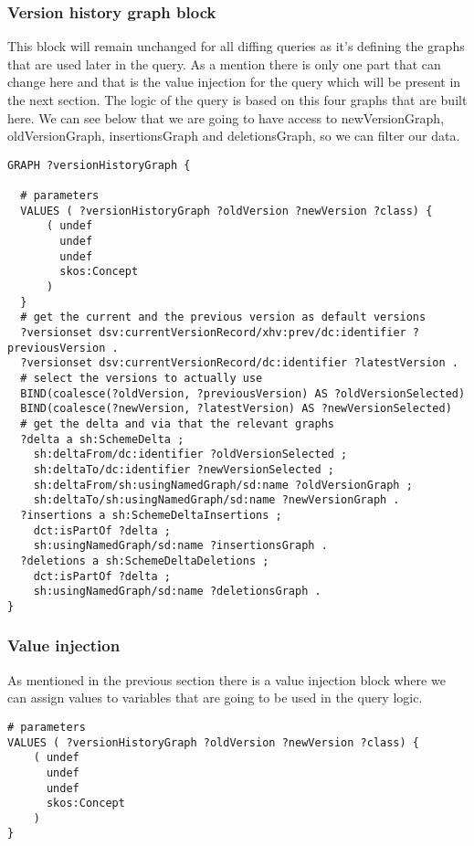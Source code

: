 \subsubsection{Version history graph block}
This block will remain unchanged for all diffing queries as it's defining the graphs that are used later in the query. As a mention there is only one part that can change here and that is the value injection for the query which will be present in the next section. The logic of the query is based on this four graphs that are built here. We can see below that we are going to have access to newVersionGraph, oldVersionGraph, insertionsGraph and deletionsGraph, so we can filter our data.

\begin{lstlisting}
GRAPH ?versionHistoryGraph {

  # parameters
  VALUES ( ?versionHistoryGraph ?oldVersion ?newVersion ?class) {
      ( undef 
        undef 
        undef  
        skos:Concept 
      )
  }
  # get the current and the previous version as default versions
  ?versionset dsv:currentVersionRecord/xhv:prev/dc:identifier ?previousVersion .
  ?versionset dsv:currentVersionRecord/dc:identifier ?latestVersion .
  # select the versions to actually use
  BIND(coalesce(?oldVersion, ?previousVersion) AS ?oldVersionSelected)
  BIND(coalesce(?newVersion, ?latestVersion) AS ?newVersionSelected)
  # get the delta and via that the relevant graphs
  ?delta a sh:SchemeDelta ;
    sh:deltaFrom/dc:identifier ?oldVersionSelected ;
    sh:deltaTo/dc:identifier ?newVersionSelected ;
    sh:deltaFrom/sh:usingNamedGraph/sd:name ?oldVersionGraph ;
    sh:deltaTo/sh:usingNamedGraph/sd:name ?newVersionGraph .
  ?insertions a sh:SchemeDeltaInsertions ;
    dct:isPartOf ?delta ;
    sh:usingNamedGraph/sd:name ?insertionsGraph .
  ?deletions a sh:SchemeDeltaDeletions ;
    dct:isPartOf ?delta ;
    sh:usingNamedGraph/sd:name ?deletionsGraph .
}
\end{lstlisting}

\subsubsection{Value injection}
As mentioned in the previous section there is a value injection block where we can assign values to variables that are going to be used in the query logic.

\begin{lstlisting}
# parameters
VALUES ( ?versionHistoryGraph ?oldVersion ?newVersion ?class) {
    ( undef 
      undef 
      undef  
      skos:Concept 
    )
}
\end{lstlisting}

